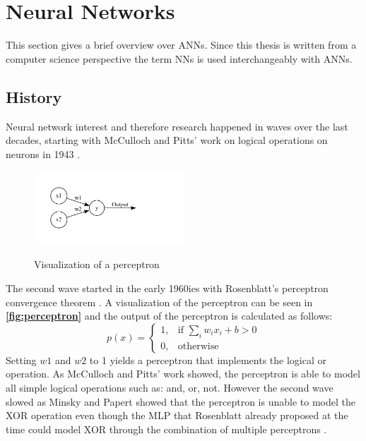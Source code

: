 \documentclass[10pt]{book}
\newcommand{\figureref}[1]{\textbf{\autoref{#1}}}
\begin{document}
\section{Neural Networks}

This section gives a brief overview over \acp{ANN}. Since this thesis is written from a computer science perspective the term \acp{NN} is used interchangeably with \acp{ANN}.

\subsection{History}

Neural network interest and therefore research happened in waves over the last decades, starting with McCulloch and Pitts' work on logical operations on neurons in 1943 \cite{mcculloch1943logical,485891}. 

\begin{figure}
  \caption{Visualization of a perceptron}
  \includegraphics[width=0.5\textwidth]{graph/rosenblatt}
  \label{fig:perceptron}
\end{figure}

The second wave started in the early 1960ies with Rosenblatt's perceptron convergence theorem \cite{rosenblatt1962principles}. A visualization of the perceptron can be seen in \figureref{fig:perceptron} and the output of the perceptron is calculated as follows:
\[
    p(x)= 
\begin{cases}
    1, & \text{if } \sum_i w_ix_i + b > 0\\
    0, & \text{otherwise}
\end{cases}
\]
Setting $w1$ and $w2$ to 1 yields a perceptron that implements the logical or operation. As McCulloch and Pitts' work showed, the perceptron is able to model all simple logical operations such as: and, or, not. However the second wave slowed as Minsky and Papert showed that the perceptron is unable to model the XOR operation \cite{minsky1969perceptron} even though the \ac{MLP} that Rosenblatt already proposed at the time could model XOR through the combination of multiple perceptrons \cite{schmidhuber2022annotated}.
\end{document}
